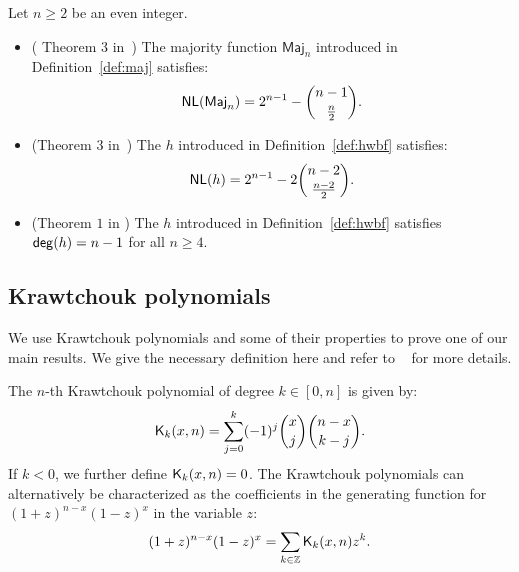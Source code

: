\documentclass[11pt]{llncs}
\begin{document}


\begin{Prop}\label{prop:wwd1}
	Let $n\geq 2$ be an even integer.
	\begin{itemize}
		\item (\eg{} Theorem $3$ in~\cite{DCC:DalMaiSar06}) The majority function $\mathsf{Maj}_n$ introduced in Definition~\ref{def:maj} satisfies:
		\[
		\mathsf{NL}(\mathsf{Maj}_n)=2^{n-1}-\binom{n-1}{\frac n2}.
		\]
		\item (Theorem $3$ in~\cite{DAM:WCST14}) The \hwbf{} $h$ introduced in Definition~\ref{def:hwbf} satisfies:
		\[
		\mathsf{NL}(h)=2^{n-1}-2\binom{n-2}{\frac{n-2}{2}}.
		\]	
		\item (Theorem $1$ in \cite{DAM:WCST14}) The \hwbf{} $h$ introduced in Definition~\ref{def:hwbf} satisfies $\mathsf{deg}(h)=n-1$ for all $n\geq 4$.
	\end{itemize}
\end{Prop}



\subsection{Krawtchouk polynomials}
We use Krawtchouk polynomials and some of their properties to prove one of our main results. We give the necessary definition here and refer to \eg{}~\cite{book:MacSlo78} for more details.

\begin{definition}\label{def:Kraw}
	The $n$-th Krawtchouk polynomial of degree $k\in[0,n]$ is given by:
    \[
        \mathsf{K}_{k}(x,n)=\sum_{j=0}^{k} (-1)^j \binom{x}{j} \binom{n-x}{k-j}.
    \]
    If $k<0$, we further define $\mathsf{K}_{k}(x,n)=0$. The Krawtchouk polynomials can alternatively be characterized as the coefficients in the generating function for $(1+z)^{n-x} (1-z)^x$ in the variable $z$:
    \[
        (1+z)^{n-x} (1-z)^x=\sum_{k\in\mathbb{Z}} \mathsf{K}_{k}(x,n) z^k.
    \]
\end{definition} 
\end{document}
